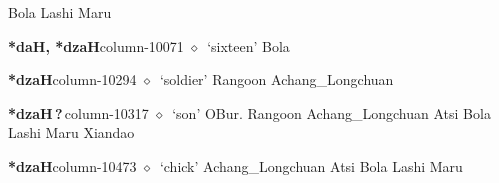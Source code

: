 \hspace{1ex}
         Bola 
\hspace{1ex}
         Lashi 
\hspace{1ex}
         Maru 
  \item {\footnotesize \textbf{*daH, *dzaH}}{\tiny column-10071}
         $\diamond$~`sixteen'
         Bola 
  \item {\footnotesize \textbf{*dzaH}}{\tiny column-10294}
         $\diamond$~`soldier'
         Rangoon 
\hspace{1ex}
         Achang\_Longchuan 
  \item {\footnotesize \textbf{*dzaH\,?\,}}{\tiny column-10317}
         $\diamond$~`son'
         OBur. 
\hspace{1ex}
         Rangoon 
\hspace{1ex}
         Achang\_Longchuan 
\hspace{1ex}
         Atsi 
\hspace{1ex}
         Bola 
\hspace{1ex}
         Lashi 
\hspace{1ex}
         Maru 
\hspace{1ex}
         Xiandao 
  \item {\footnotesize \textbf{*dzaH}}{\tiny column-10473}
         $\diamond$~`chick'
         Achang\_Longchuan 
\hspace{1ex}
         Atsi 
\hspace{1ex}
         Bola 
\hspace{1ex}
         Lashi 
\hspace{1ex}
         Maru 
\hspace{1ex}

